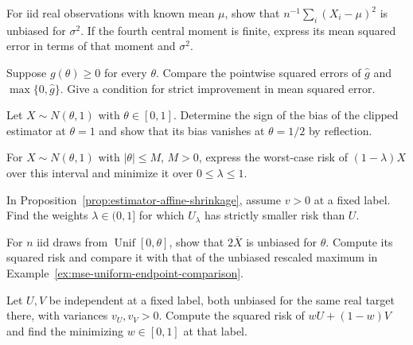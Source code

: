 \documentclass[11pt,oneside]{book}
\theoremstyle{definition}
\theoremstyle{remark}
\begin{document}
\begin{practiceexercise}
\label{pex:mse-known-mean-variance}
For iid real observations with known mean $\mu$, show that
$n^{-1}\sum_i(X_i-\mu)^2$ is unbiased for $\sigma^2$. If the
fourth central moment is finite, express its mean squared
error in terms of that moment and $\sigma^2$.
\end{practiceexercise}

\begin{practiceexercise}
\label{pex:mse-project-half-line}
Suppose $g(\theta)\geq0$ for every $\theta$. Compare the pointwise
squared errors of $\widehat g$ and $\max\{0,\widehat g\}$.
Give a condition for strict improvement in mean squared error.
\end{practiceexercise}

\begin{practiceexercise}
\label{pex:mse-clipping-boundary-bias}
Let $X\sim N(\theta,1)$ with $\theta\in[0,1]$. Determine the sign
of the bias of the clipped estimator at $\theta=1$ and show
that its bias vanishes at $\theta=1/2$ by reflection.
\end{practiceexercise}

\begin{practiceexercise}
\label{pex:mse-bounded-normal-shrinkage-weight}
For $X\sim N(\theta,1)$ with $|\theta|\leq M$, $M>0$, express
the worst-case risk of $(1-\lambda)X$ over this interval and
minimize it over $0\leq\lambda\leq1$.
\end{practiceexercise}

\begin{practiceexercise}
\label{pex:mse-shrinkage-improvement}
In Proposition~\ref{prop:estimator-affine-shrinkage}, assume
$v>0$ at a fixed label. Find the weights $\lambda\in(0,1]$
for which $U_\lambda$ has strictly smaller risk than $U$.
\end{practiceexercise}

\begin{practiceexercise}
\label{pex:mse-uniform-double-mean}
For $n$ iid draws from $\operatorname{Unif}[0,\theta]$, show
that $2\overline X$ is unbiased for $\theta$. Compute its
squared risk and compare it with that of the unbiased rescaled
maximum in Example~\ref{ex:mse-uniform-endpoint-comparison}.
\end{practiceexercise}

\begin{practiceexercise}
\label{pex:mse-average-independent-estimates}
Let $U,V$ be independent at a fixed label, both unbiased for
the same real target there, with variances $v_U,v_V>0$.
Compute the squared risk of $wU+(1-w)V$ and find the minimizing
$w\in[0,1]$ at that label.
\end{practiceexercise}
\end{document}
